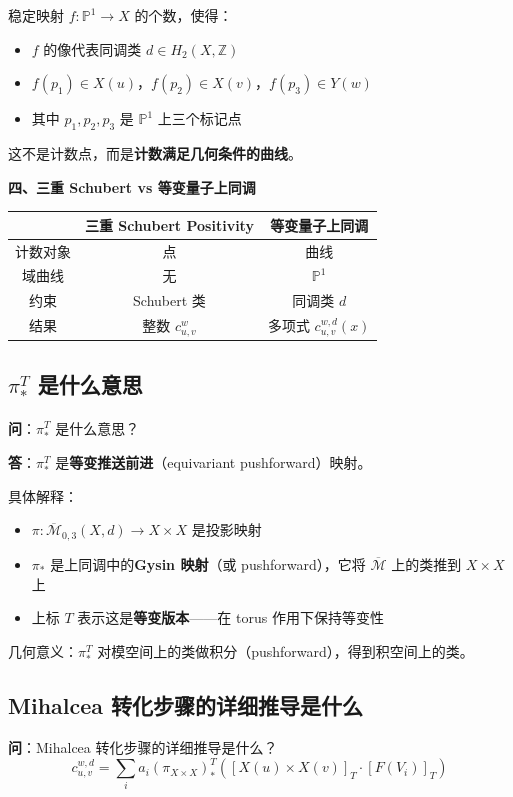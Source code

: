 稳定映射 $f: \mathbb{P}^1 \to X$ 的个数，使得：
\begin{itemize}
\item $f$ 的像代表同调类 $d \in H_2(X,\mathbb{Z})$
\item $f(p_1) \in X(u)$，$f(p_2) \in X(v)$，$f(p_3) \in Y(w)$
\item 其中 $p_1, p_2, p_3$ 是 $\mathbb{P}^1$ 上三个标记点
\end{itemize}

这不是计数点，而是\textbf{计数满足几何条件的曲线}。

\textbf{四、三重 Schubert vs 等变量子上同调}

\begin{center}
\begin{tabular}{c|c|c}
\hline
 & 三重 Schubert Positivity & 等变量子上同调 \\ \hline
计数对象 & 点 & 曲线 \\
域曲线 & 无 & $\mathbb{P}^1$ \\
约束 & Schubert 类 & 同调类 $d$ \\
结果 & 整数 $c_{u,v}^w$ & 多项式 $c_{u,v}^{w,d}(x)$ \\ \hline
\end{tabular}
\end{center}

\subsection{$\pi_*^T$ 是什么意思}\label{sec:qa-pi-star-T}
\textbf{问}：$\pi_*^T$ 是什么意思？

\textbf{答}：$\pi_*^T$ 是\textbf{等变推送前进}（equivariant pushforward）映射。

具体解释：
\begin{itemize}
\item $\pi: \overline{\mathcal{M}}_{0,3}(X,d) \to X \times X$ 是投影映射
\item $\pi_*$ 是上同调中的\textbf{Gysin 映射}（或 pushforward），它将 $\overline{\mathcal{M}}$ 上的类推到 $X \times X$ 上
\item 上标 $T$ 表示这是\textbf{等变版本}——在 torus 作用下保持等变性
\end{itemize}

几何意义：$\pi_*^T$ 对模空间上的类做积分（pushforward），得到积空间上的类。

\subsection{Mihalcea 转化步骤的详细推导是什么}\label{sec:qa-mihalcea-derivation-step}
\textbf{问}：Mihalcea 转化步骤的详细推导是什么？
$$c_{u, v}^{w, d}=\sum_i a_i\left(\pi_{X \times X}\right)_*^T\left([X(u) \times X(v)]_T \cdot\left[F\left(V_i\right)\right]_T\right)$$

